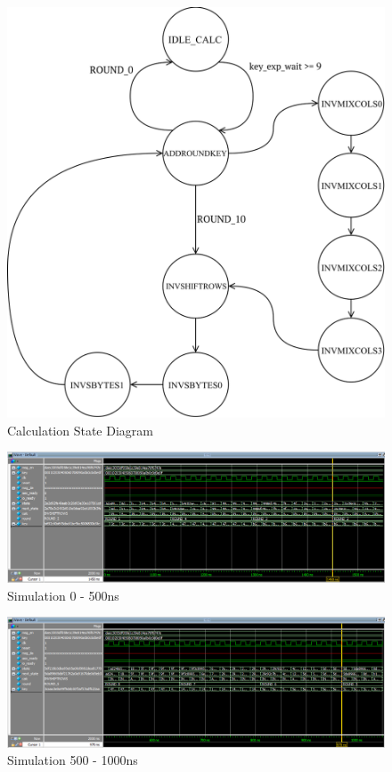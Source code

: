 \documentclass[journal, twocolumn, final,11pt,letterpaper]{IEEEtran}
\begin{document}
\begin{figure} [H]
	\centering
	\includegraphics[scale=.6]{Calc_State_Diagram.png}
	\caption{Calculation State Diagram\label{fig:calc-state}}
\end{figure}         

\begin{figure} [H]
	\centering
	\includegraphics[scale=.35]{simulate-0-500.png}
	\caption{Simulation 0 - 500ns\label{fig:0-500}}
\end{figure}          


\begin{figure} [H]
	\centering
	\includegraphics[scale=.35]{simulate-500-1000.png}
	\caption{Simulation 500 - 1000ns\label{fig:500-1000}}
\end{figure}          
\end{document}
